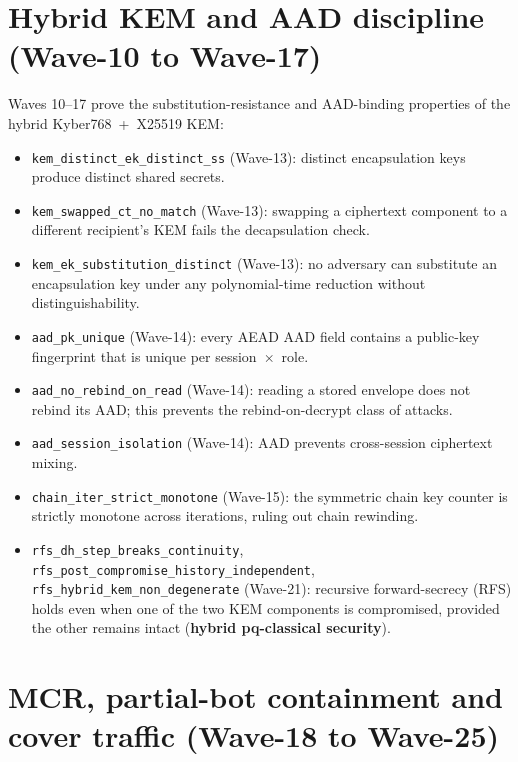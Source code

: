 \section{Hybrid KEM and AAD discipline (Wave-10 to Wave-17)}
\label{sec:chat:kem-aad}

Waves 10--17 prove the substitution-resistance and AAD-binding
properties of the hybrid Kyber768~+~X25519 KEM:

\begin{itemize}
  \item \texttt{kem\_distinct\_ek\_distinct\_ss} (Wave-13): distinct
        encapsulation keys produce distinct shared secrets.
  \item \texttt{kem\_swapped\_ct\_no\_match} (Wave-13): swapping a
        ciphertext component to a different recipient's KEM fails the
        decapsulation check.
  \item \texttt{kem\_ek\_substitution\_distinct} (Wave-13): no
        adversary can substitute an encapsulation key under any
        polynomial-time reduction without distinguishability.
  \item \texttt{aad\_pk\_unique} (Wave-14): every AEAD AAD field
        contains a public-key fingerprint that is unique per
        session~$\times$~role.
  \item \texttt{aad\_no\_rebind\_on\_read} (Wave-14): reading a stored
        envelope does not rebind its AAD; this prevents the
        rebind-on-decrypt class of attacks.
  \item \texttt{aad\_session\_isolation} (Wave-14): AAD prevents
        cross-session ciphertext mixing.
  \item \texttt{chain\_iter\_strict\_monotone} (Wave-15): the symmetric
        chain key counter is strictly monotone across iterations,
        ruling out chain rewinding.
  \item \texttt{rfs\_dh\_step\_breaks\_continuity},
        \texttt{rfs\_post\_compromise\_history\_independent},
        \texttt{rfs\_hybrid\_kem\_non\_degenerate} (Wave-21):
        recursive forward-secrecy (RFS) holds even when one of the two
        KEM components is compromised, provided the other remains
        intact (\textbf{hybrid pq-classical security}).
\end{itemize}

\section{MCR, partial-bot containment and cover traffic (Wave-18 to Wave-25)}
\label{sec:chat:mcr-bot-cover}

